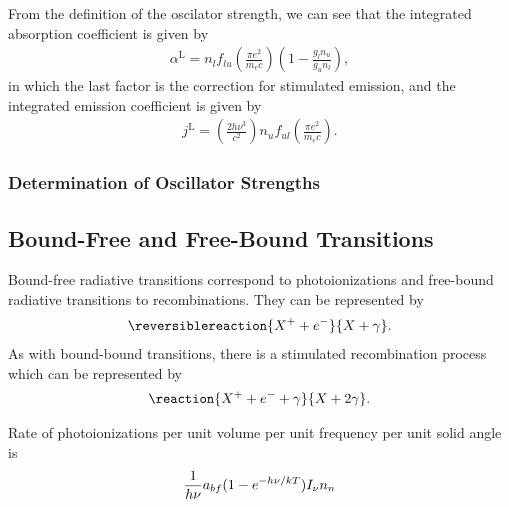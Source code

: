 From the definition of the oscilator strength, we can see
that the integrated absorption coefficient is given by
\begin{align}
\alpha^\mathrm{L} =  n_l f_{lu}\left(\frac{\pi e^2}{m_e c}\right)\left(1 - \frac{g_l n_u}{g_u n_l}\right),
\end{align}
in which the last factor is the correction for stimulated
emission, and the integrated emission coefficient is given
by
\begin{align}
j^\mathrm{L} = \left(\frac{2h\nu^3}{c^2}\right)n_u
f_{ul}\left(\frac{\pi e^2}{m_e c}\right).
\end{align}

\subsubsection{Determination of Oscillator Strengths}


\subsection{Bound-Free and Free-Bound Transitions}


Bound-free radiative transitions correspond to
photoionizations and free-bound radiative transitions to
recombinations. They can be represented by
\begin{align}
\reversiblereaction{X^+ + e^-}{X + \gamma}.
\end{align}
As with bound-bound transitions, there is a stimulated
recombination process which can be represented by
\begin{align}
\reaction{X^+ + e^- + \gamma}{X + 2\gamma}.
\end{align}

Rate of photoionizations per unit volume per unit frequency per unit
solid angle is
\begin{align}
\frac{1}{h\nu} a_{bf} (1 - e^{-h\nu/kT}) I_\nu n_n
\end{align}


